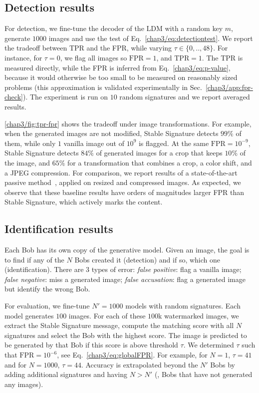 \subsection{Detection results}
For detection, we fine-tune the decoder of the LDM with a random key $m$, generate $1000$ images and use the test of Eq.~\eqref{chap3/eq:detectiontest}.
We report the tradeoff between TPR and the FPR, while varying $\tau\in \{0, .. ,48\}$.
For instance, for $\tau=0$, we flag all images so $\textrm{FPR}=1$, and $\textrm{TPR}=1$.
The TPR is measured directly, while the FPR is inferred from Eq.~\eqref{chap3/eq:p-value}, because it would otherwise be too small to be measured on reasonably sized problems 
(this approximation is validated experimentally in Sec.~\ref{chap3/app:fpr-check}).
The experiment is run on $10$ random signatures and we report averaged results.

\autoref{chap3/fig:tpr-fpr} shows the tradeoff under image transformations.
For example, when the generated images are not modified, Stable Signature detects $99\%$ of them, while only $1$ vanilla image out of $10^9$ is flagged.
At the same $\textrm{FPR}=10^{-9}$, Stable Signature detects $84\%$ of generated images for a crop that keeps $10\%$ of the image, 
and $65\%$ for a transformation that combines a crop, a color shift, and a JPEG compression.
For comparison, we report results of a state-of-the-art passive method~\citep{corvi2022detection}, applied on resized and compressed images.
As expected, we observe that these baseline results have orders of magnitudes larger FPR than Stable Signature, which actively marks the content. 




\subsection{Identification results}
Each Bob has its own copy of the generative model. 
Given an image, the goal is to find if any of the $N$ Bobs created it (detection) and if so, which one (identification).
There are $3$ types of error: 
\emph{false positive}: flag a vanilla image; 
\emph{false negative}: miss a generated image; 
\emph{false accusation}: flag a generated image but identify the wrong Bob.

For evaluation, we fine-tune $N'=1000$ models with random signatures.
Each model generates $100$ images.
For each of these $100$k watermarked images, we extract the Stable Signature message, compute the matching score with all $N$ signatures and select the Bob with the highest score. 
The image is predicted to be generated by that Bob if this score is above threshold $\tau$.
We determined $\tau$ such that $\textrm{FPR}=10^{-6}$, see Eq.~\eqref{chap3/eq:globalFPR}. 
For example, for $N=1$, $\tau=41$ and for $N=1000$, $\tau=44$.
Accuracy is extrapolated beyond the $N'$ Bobs by adding additional signatures and having $N > N'$ (\eg, Bobs that have not generated any images).

